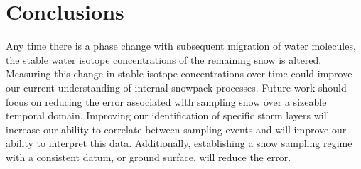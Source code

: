 \section{Conclusions}
Any time there is a phase change with subsequent migration of water molecules, the stable water isotope concentrations of the remaining snow is altered. Measuring this change in stable isotope concentrations over time could improve our current understanding of internal snowpack processes. Future work should focus on reducing the error associated with sampling snow over a sizeable temporal domain. Improving our identification of specific storm layers will increase our ability to correlate between sampling events and will improve our ability to interpret this data. Additionally, establishing a snow sampling regime with a consistent datum, or ground surface, will reduce the error.   